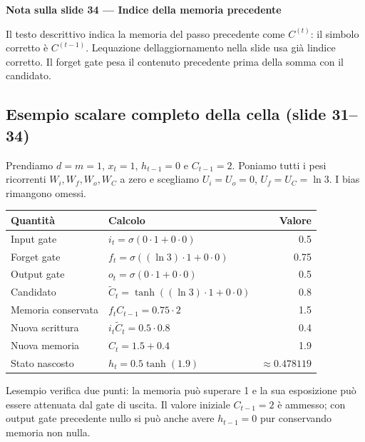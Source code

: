 \documentclass[11pt,a4paper,oneside,openany]{book}
\renewenvironment{quote}{\list{}{\leftmargin=1em\rightmargin=0pt}\item\relax}{\endlist}
\begin{document}
\begin{quote}
\textbf{Nota sulla slide 34 --- Indice della memoria precedente}
\end{quote}

\begin{quote}
Il testo descrittivo indica la memoria del passo precedente come \(C^{(t)}\): il simbolo corretto è \(C^{(t-1)}\). L\textquotesingle equazione dell\textquotesingle aggiornamento nella slide usa già l\textquotesingle indice corretto. Il forget gate pesa il contenuto precedente prima della somma con il candidato.
\end{quote}

\subsection{Esempio scalare completo della cella (slide 31--34)}\label{f03-r819}

Prendiamo \(d=m=1\), \(x_t=1\), \(h_{t-1}=0\) e \(C_{t-1}=2\). Poniamo tutti i pesi ricorrenti \(W_i,W_f,W_o,W_C\) a zero e scegliamo \(U_i=U_o=0\), \(U_f=U_C=\ln3\). I bias rimangono omessi.

\begin{longtable}[]{@{}llr@{}}
\toprule\noalign{}
Quantità & Calcolo & Valore \\
\midrule\noalign{}
\endhead
\bottomrule\noalign{}
\endlastfoot
Input gate & \(i_t=\sigma(0\cdot1+0\cdot0)\) & 0.5 \\
Forget gate & \(f_t=\sigma((\ln3)\cdot1+0\cdot0)\) & 0.75 \\
Output gate & \(o_t=\sigma(0\cdot1+0\cdot0)\) & 0.5 \\
Candidato & \(\widetilde C_t=\tanh((\ln3)\cdot1+0\cdot0)\) & 0.8 \\
Memoria conservata & \(f_tC_{t-1}=0.75\cdot2\) & 1.5 \\
Nuova scrittura & \(i_t\widetilde C_t=0.5\cdot0.8\) & 0.4 \\
Nuova memoria & \(C_t=1.5+0.4\) & 1.9 \\
Stato nascosto & \(h_t=0.5\tanh(1.9)\) & \(\approx0.478119\) \\
\end{longtable}

L\textquotesingle esempio verifica due punti: la memoria può superare 1 e la sua esposizione può essere attenuata dal gate di uscita. Il valore iniziale \(C_{t-1}=2\) è ammesso; con output gate precedente nullo si può anche avere \(h_{t-1}=0\) pur conservando memoria non nulla.
\end{document}
